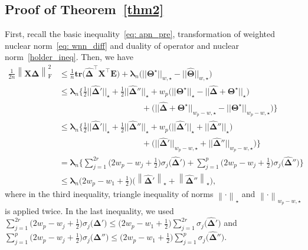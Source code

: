 \documentclass[alpha-refs]{wiley-article}
\begin{document}
\subsection{Proof of Theorem~\ref{thm2}} \label{pf_thm_3_2}
First, recall the basic inequality~\eqref{eq: apn_pre}, transformation of weighted nuclear norm~\eqref{eq: wnn_diff} and duality of operator and nuclear norm~\eqref{holder_ineq}.
Then, we have
\begin{align}
    \frac{1}{2n} \left\| \boldsymbol{X} \boldsymbol{\widehat{\Delta}} \right\|_{\text{F}}^{2} 
    &\leq \frac{1}{n} \textbf{tr}\big( \boldsymbol{\widehat{\Delta}}^{\top} \boldsymbol{X}^{\top}\boldsymbol{E} \big) + 
    \boldsymbol{\lambda}_{n} \big( ||\boldsymbol{\Theta^{\star}}||_{w,\star} - ||\widehat{\boldsymbol{\Theta}}||_{w,\star} \big) \nonumber \\
    &\leq \boldsymbol{\lambda}_{n}\bigg\{ \frac{1}{2}||\boldsymbol{\widehat{\Delta}}'||_{\star} 
    + \frac{1}{2}||\boldsymbol{\widehat{\Delta}}''||_{\star}
    + w_{p}\big( ||\boldsymbol{\Theta^{\star}}||_{\star} - ||\boldsymbol{\widehat{\Delta}}  + \boldsymbol{\Theta^{\star}}||_{\star} \big) \nonumber \\
    &\qquad \qquad \qquad \qquad \qquad + \big( ||\boldsymbol{\widehat{\Delta}} + \boldsymbol{\Theta^{\star}}||_{w_{p}-w,\star} - ||\boldsymbol{\Theta^{\star}}||_{w_{p}-w,\star}\big)\bigg\} \nonumber \\
    &\leq \boldsymbol{\lambda}_{n}\bigg\{ \frac{1}{2}||\boldsymbol{\widehat{\Delta}}'||_{\star} 
    + \frac{1}{2}||\boldsymbol{\widehat{\Delta}}''||_{\star}
    + w_{p}\big( ||\boldsymbol{\widehat{\Delta}}'||_{\star} + ||\boldsymbol{\widehat{\Delta}}''||_{\star} \big) \nonumber \\
    &\qquad \qquad \qquad \qquad \qquad + \big( ||\boldsymbol{\widehat{\Delta}}'||_{w_{p}-w,\star} + ||\boldsymbol{\widehat{\Delta}}''||_{w_{p}-w,\star}\big)\bigg\} \nonumber \\
    &=\boldsymbol{\lambda}_{n}\bigg\{ \sum_{j=1}^{2r}\bigg(2w_{p}-w_{j}+\frac{1}{2}\bigg)\sigma_{j}\big(\boldsymbol{\widehat{\Delta}}'\big) + \sum_{j=1}^{p}\bigg(2w_{p}-w_{j}+\frac{1}{2}\bigg)\sigma_{j}\big(\boldsymbol{\widehat{\Delta}}''\big)\bigg\} \nonumber \\
    &\leq \boldsymbol{\lambda}_{n} \bigg( 2w_{p}-w_{1}+\frac{1}{2} \bigg)
    \bigg( \left\|\boldsymbol{\widehat{\Delta}}'\right\|_{\star} + \left\|\boldsymbol{\widehat{\Delta}}'' \right\|_{\star} \bigg),  \label{eq: basic}
\end{align}
where in the third inequality, triangle inequality of norms $\left\| \cdot \right\|_{\star}$ and $\left\| \cdot \right\|_{w_{p}-w,\star}$ is applied twice.
In the last inequality, we used 
$\sum_{j=1}^{2r}\big(2w_{p}-w_{j}+\frac{1}{2}\big)\sigma_{j}\big(\boldsymbol{\widehat{\Delta}}'\big)\leq \big(2w_{p}-w_{1}+\frac{1}{2}\big) \sum_{j=1}^{2r}\sigma_{j}\big(\boldsymbol{\widehat{\Delta}}'\big)$ and 
$\sum_{j=1}^{p}\big(2w_{p}-w_{j}+\frac{1}{2}\big)\sigma_{j}\big(\boldsymbol{\widehat{\Delta}}''\big)\leq \big(2w_{p}-w_{1}+\frac{1}{2}\big) \sum_{j=1}^{p}\sigma_{j}\big(\boldsymbol{\widehat{\Delta}}''\big)$.
\end{document}
